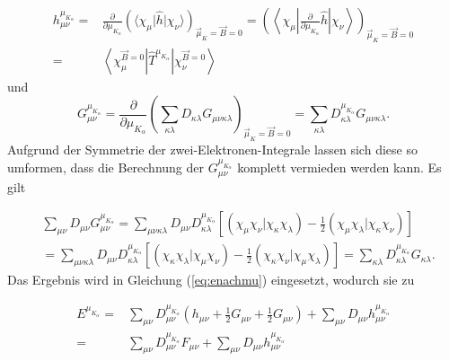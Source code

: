      \begin{equation}\label{eq:hmukelemente}
     \begin{aligned}
       h_{\mu\nu}^{\mu_{K_\alpha}}=&\frac{\partial}{\partial \mu_{K_\alpha}}\left(\langle\chi_\mu\vert\hat{h}\vert\chi_\nu\rangle\right)_{\vec{\mu}_K=\vec{B}=0}=\left(\left\langle\chi_\mu\left\vert\frac{\partial}{\partial \mu_{K_\alpha}}\hat{h}\right\vert\chi_\nu\right\rangle\right)_{\vec{\mu}_K=\vec{B}=0}\\
       =&\left\langle\chi_\mu^{\vec{B}=0}\left\vert\hat{T}^{\mu_{K_\alpha}}\right\vert\chi_\nu^{\vec{B}=0}\right\rangle
     \end{aligned}
     \end{equation}
     und 
     \begin{equation}
      G_{\mu\nu}^{\mu_{K_\alpha}}= \frac{\partial}{\partial\mu_{K_\alpha}} \left(\sum_{\kappa\lambda}D_{\kappa\lambda}G_{\mu\nu\kappa\lambda}\right)_{\vec{\mu}_K=\vec{B}=0}=\sum_{\kappa\lambda}D_{\kappa\lambda}^{\mu_{K_\alpha}}G_{\mu\nu\kappa\lambda}.
     \end{equation}
     Aufgrund der Symmetrie der zwei-Elektronen-Integrale lassen sich diese so umformen, dass die Berechnung der $G_{\mu\nu}^{\mu_{K_\alpha}}$ komplett vermieden werden kann. Es gilt
     
     \begin{equation}
     \begin{aligned}
     &\sum_{\mu\nu}D_{\mu\nu}G_{\mu\nu}^{\mu_{K_\alpha}}=\sum_{\mu\nu\kappa\lambda}D_{\mu\nu}D_{\kappa\lambda}^{\mu_{K_\alpha}}\left[(\chi_\mu\chi_\nu\vert\chi_\kappa\chi_\lambda)-\frac{1}{2}(\chi_\mu\chi_\lambda\vert\chi_\kappa\chi_\nu)\right]\\
     &=\sum_{\mu\nu\kappa\lambda}D_{\mu\nu}D_{\kappa\lambda}^{\mu_{K_\alpha}}\left[(\chi_\kappa\chi_\lambda\vert\chi_\mu\chi_\nu)-\frac{1}{2}(\chi_\kappa\chi_\nu\vert\chi_\mu\chi_\lambda)\right]=\sum_{\kappa\lambda}D_{\kappa\lambda}^{\mu_{K_\alpha}}G_{\kappa\lambda}.
     \end{aligned}
     \end{equation}
     Das Ergebnis wird in Gleichung (\ref{eq:enachmu}) eingesetzt, wodurch sie zu

	\begin{equation}
    \begin{aligned}
	  E^{\mu_{K_\alpha}}=&\sum_{\mu\nu}D_{\mu\nu}^{\mu_{K_\alpha}}(h_{\mu\nu}+\frac{1}{2}G_{\mu\nu}+\frac{1}{2}G_{\mu\nu})+\sum_{\mu\nu}D_{\mu\nu}h_{\mu\nu}^{\mu_{K_\alpha}}\\
	  =&\sum_{\mu\nu}D_{\mu\nu}^{\mu_{K_\alpha}}F_{\mu\nu}+\sum_{\mu\nu}D_{\mu\nu}h_{\mu\nu}^{\mu_{K_\alpha}}
    \end{aligned}
	\end{equation}     
     
